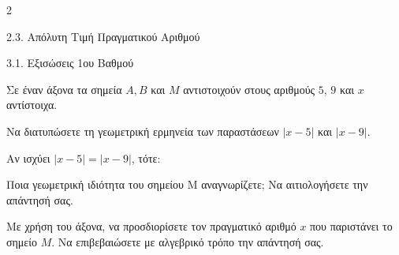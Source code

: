 \begin{ylh}{2}
    \item 2.3. Απόλυτη Τιμή Πραγματικού Αριθμού
    \item 3.1. Εξισώσεις 1ου Βαθμού
\end{ylh}
Σε έναν άξονα τα σημεία $A,B$ και $M$ αντιστοιχούν στους αριθμούς $5$, $9$ και $x$ αντίστοιχα.
\begin{alist}
\item Να διατυπώσετε τη γεωμετρική ερμηνεία των παραστάσεων $|x - 5|$ και $|x - 9|$.
\item Αν ισχύει $|x - 5| = |x - 9|$, τότε:
\begin{rlist}
\item Ποια γεωμετρική ιδιότητα του σημείου Μ αναγνωρίζετε; Να αιτιολογήσετε την απάντησή σας.

\item Με χρήση του άξονα, να προσδιορίσετε τον πραγματικό αριθμό $x$ που παριστάνει το σημείο $M$. Να επιβεβαιώσετε με αλγεβρικό τρόπο την απάντησή σας.

\end{rlist}
\end{alist}

